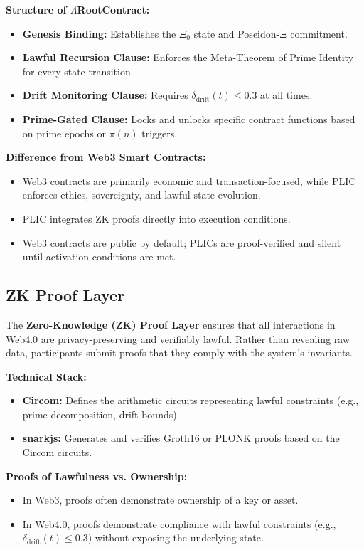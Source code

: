 \documentclass[12]{amsart}
\theoremstyle{plain}
\begin{document}
\textbf{Structure of $\Lambda$RootContract:}
\begin{itemize}
    \item \textbf{Genesis Binding:} Establishes the $\Xi_0$ state and Poseidon-$\Xi$ commitment.
    \item \textbf{Lawful Recursion Clause:} Enforces the Meta-Theorem of Prime Identity for every state transition.
    \item \textbf{Drift Monitoring Clause:} Requires $\delta_{\text{drift}}(t) \leq 0.3$ at all times.
    \item \textbf{Prime-Gated Clause:} Locks and unlocks specific contract functions based on prime epochs or $\pi(n)$ triggers.
\end{itemize}

\textbf{Difference from Web3 Smart Contracts:}
\begin{itemize}
    \item Web3 contracts are primarily economic and transaction-focused, while PLIC enforces ethics, sovereignty, and lawful state evolution.
    \item PLIC integrates ZK proofs directly into execution conditions.
    \item Web3 contracts are public by default; PLICs are proof-verified and silent until activation conditions are met.
\end{itemize}

\subsection{ZK Proof Layer}
The \textbf{Zero-Knowledge (ZK) Proof Layer} ensures that all interactions in Web4.0 are privacy-preserving and verifiably lawful. Rather than revealing raw data, participants submit proofs that they comply with the system’s invariants.

\textbf{Technical Stack:}
\begin{itemize}
    \item \textbf{Circom:} Defines the arithmetic circuits representing lawful constraints (e.g., prime decomposition, drift bounds).
    \item \textbf{snarkjs:} Generates and verifies Groth16 or PLONK proofs based on the Circom circuits.
\end{itemize}

\textbf{Proofs of Lawfulness vs. Ownership:}
\begin{itemize}
    \item In Web3, proofs often demonstrate ownership of a key or asset.
    \item In Web4.0, proofs demonstrate compliance with lawful constraints (e.g., $\delta_{\text{drift}}(t) \leq 0.3$) without exposing the underlying state.
\end{itemize}
\end{document}
